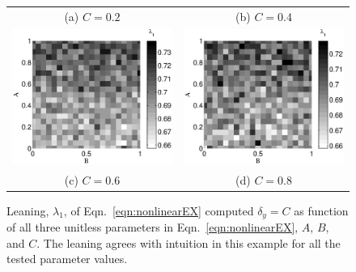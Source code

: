 \documentclass[twocolumn,aps,pre,groupedaddress]{revtex4-1}
\begin{document}
\begin{figure}[ht]
\begin{tabular}{cc}
(a) $C=0.2$ & (b) $C=0.4$ \\
\includegraphics[scale=0.30]{NonlinearCyclicexample_BxytolC06.eps} &
\includegraphics[scale=0.30]{NonlinearCyclicexample_BxytolC08.eps} \\
(c) $C=0.6$ & (d) $C=0.8$ \\
\end{tabular}
\caption{Leaning, $\lambda_1$, of Eqn.\ \ref{eqn:nonlinearEX} computed $\delta_y=C$ as function of all three unitless parameters in Eqn.\ \ref{eqn:nonlinearEX}, $A$, $B$, and $C$.  The leaning agrees with intuition in this example for all the tested parameter values.}
\label{fig:nonlin1}
\end{figure}
\end{document}
